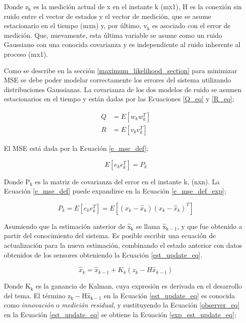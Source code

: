 \documentclass[10pt,a4paper]{article}
\begin{document}
\noindent Donde $\mathrm{z_k}$ es la medici\'on actual de x en el instante k 
(mx1), H es la conexi\'on sin ruido entre el vector de estados y el vector de 
medici\'on, que se asume estacionario en el tiempo (mxn) y, por \'ultimo, 
$\mathrm{v_k}$ es asociado con el error de medici\'on. Que, nuevamente, esta 
\'ultima variable se asume como un ruido Gaussiano con una conocida covarianza y 
es independiente al ruido inherente al proceso (mx1).

\noindent Como se describe en la secci\'on \ref{maximum_likelihood_section} para
minimizar \acrshort{MSE} se debe poder modelar correctamente los errores del
sistema utilizando distribuciones Gaussianas. La covarianza de los dos modelos
de ruido se asumen estacionarios en el tiempo y est\'an dadas por las Ecuaciones
\ref{Q_eq} y \ref{R_eq};

\begin{align}
    Q &= E\left[w_kw_k^T\right] \label{Q_eq} \\
    R &= E\left[v_kv_k^T\right] \label{R_eq}
\end{align}

El \acrshort{MSE} est\'a dada por la Ecuaci\'on \ref{e_mse_def};

\begin{equation}
    E\left[e_ke_k^T\right] = P_k \label{e_mse_def}
\end{equation}

Donde $\mathrm{P_k}$ es la matriz de covarianza del error en el instante k, 
(nxn). La Ecuaci\'on \ref{e_mse_def} puede expandirse en la Ecuaci\'on
\ref{e_mse_def_exp};

\begin{equation}
    P_k = E\left[e_ke_k^T\right] = E\left[\left(x_k - \hat{x}_k\right)\left(x_k -
    \hat{x}_k\right)^T\right]\label{e_mse_def_exp}
\end{equation}

Asumiendo que la estimaci\'on anterior de $\mathrm{\hat{x}_k}$ se llama
$\mathrm{\hat{x}_{k-1}}$, y que fue obtenido a partir del conocimiento del
sistema. Es posible escribir una ecuaci\'on de actualizaci\'on para la nueva
estimaci\'on, combinando el estado anterior con datos obtenidos de los sensores
obteniendo la Ecuaci\'on \ref{est_update_eq}.

\begin{equation}
    \hat{x}_k = \hat{x}_{k-1} + K_k\left(z_k - H\hat{x}_{k-1}\right)
    \label{est_update_eq}
\end{equation}

Donde $\mathrm{K_k}$ es la ganancia de Kalman, cuya expresi\'on es derivada en
el desarrollo del tema. El t\'ermino $\mathrm{z_k - H\hat{x}_{k-1}}$ en la
Ecuaci\'on \ref{est_update_eq} es conocida como \emph{innovaci\'on} o
\emph{medici\'on residual}, y sustituyendo la Ecuaci\'on \ref{observer_eq} en la
Ecuaci\'on \ref{est_update_eq} se obtiene la Ecuaci\'on \ref{exp_est_update_eq};
\end{document}
